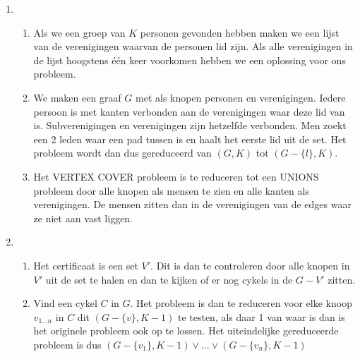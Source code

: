 \documentclass[11pt]{article}
\begin{document}
\begin{enumerate}
\begin{enumerate}
\begin{enumerate}[a]
                \end{enumerate}
            \item
                \begin{enumerate}[a]
                    \item Als we een groep van $K$ personen gevonden hebben
                        maken we een lijst van de verenigingen waarvan de
                        personen lid zijn. Als alle verenigingen in de lijst
                        hoogstens één keer voorkomen hebben we een
                        oplossing voor ons probleem.

                    \item We maken een graaf $G$ met als knopen personen en
                        verenigingen. Iedere persoon is met kanten verbonden aan
                        de verenigingen waar deze lid van is. Subverenigingen en
                        verenigingen zijn hetzelfde verbonden.
                        Men zoekt een 2 leden waar een pad tussen is en haalt
                        het eerste lid uit de set. Het probleem wordt dan dus
                        gereduceerd van $(G, K)$ tot $(G - \{l\}, K)$.

                    \item
                        Het VERTEX COVER probleem is te reduceren tot een UNIONS
                        probleem door alle knopen als mensen te zien en alle
                        kanten als verenigingen. De mensen zitten dan in de
                        verenigingen van de edges waar ze niet aan vast liggen.

                \end{enumerate}
            \item
                \begin{enumerate}[a]
                    \item
                        Het certificaat is een set $V'$. Dit is dan te
                        controleren door alle knopen in $V'$ uit de set te
                        halen en dan te kijken of er nog cykels in de $G - V'$
                        zitten.

                    \item
                        Vind een cykel $C$ in $G$. Het probleem is dan te
                        reduceren voor elke knoop $v_{1...n}$ in $C$ dit $(G -
                        \{v\}, K - 1)$ te testen, als daar 1 van waar is dan is
                        het originele probleem ook op te lossen. Het
                        uiteindelijke gereduceerde probleem is dus $(G -
                        \{v_1\}, K - 1) \lor ... \lor (G - \{v_n\}, K - 1)$


\end{enumerate}
\end{enumerate}
\end{enumerate}
\end{document}
